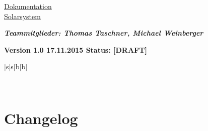 \documentclass[12pt,a4paper,oneside,ngerman]{scrartcl}
\begin{document}
\thispagestyle{empty}
\vspace*{2cm}


\begin{center}
\begin{huge}
\renewcommand{\ULthickness}{2pt}
\uline{Dokumentation}
\\
\uline{Solarsystem}
\end{huge}
\end{center}

\vspace{9cm}

\textit{\textbf{Teammitglieder: Thomas Taschner, Michael Weinberger}}
\vspace{10mm}

\textbf{{\color{g4}Version 1.0 \hfill 17.11.2015 \hfill Status: [DRAFT]}}
\\
\begin{table}[h]
\renewcommand{\arraystretch}{2.1}
\centering
\begin{tabularx}{\textwidth}{|s|s|b|b|}

\specialrule{0.07em}{0em}{0em}
 \\ \hline
\end{tabularx}
\end{table}
\newpage


\pagestyle{fancy}
\renewcommand{\headrulewidth}{0.4pt}
\renewcommand{\footrulewidth}{0.4pt}
\setlength\headheight{15pt}
\cfoot{}


\tableofcontents\thispagestyle{fancy}
\newpage


\section{Changelog}
\end{document}
